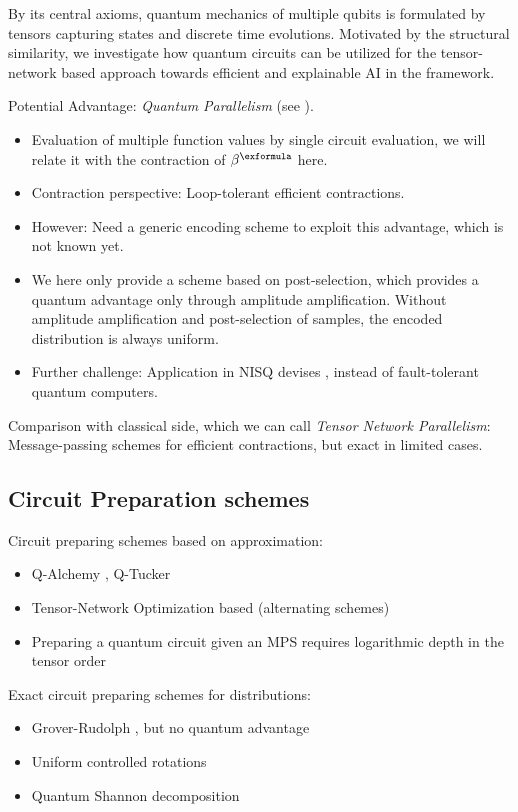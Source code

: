 By its central axioms, quantum mechanics of multiple qubits is formulated by tensors capturing states and discrete time evolutions.
Motivated by the structural similarity, we investigate how quantum circuits can be utilized for the tensor-network based approach towards efficient and explainable AI in the \tnreason{} framework.

Potential Advantage: \emph{Quantum Parallelism} (see \cite[Section 3.2.5]{schuld_machine_2021}).
\begin{itemize}
    \item Evaluation of multiple function values by single circuit evaluation, we will relate it with the contraction of $\bencodingof{\exformula}$ here.
    \item Contraction perspective: Loop-tolerant efficient contractions.
    \item However: Need a generic encoding scheme to exploit this advantage, which is not known yet.
    \item We here only provide a scheme based on post-selection, which provides a quantum advantage only through amplitude amplification.
    Without amplitude amplification and post-selection of samples, the encoded distribution is always uniform.
    \item Further challenge: Application in NISQ devises \cite{preskill_quantum_2018}, instead of fault-tolerant quantum computers.
\end{itemize}
Comparison with classical side, which we can call \emph{Tensor Network Parallelism}:
Message-passing schemes for efficient contractions, but exact in limited cases.

\subsection{Circuit Preparation schemes}

Circuit preparing schemes based on approximation:
\begin{itemize}
    \item Q-Alchemy \cite{araujo_low-rank_2023}, Q-Tucker \cite{blank_tucker_2026}
    \item Tensor-Network Optimization based (alternating schemes) \cite{rudolph_synergistic_2023,rudolph_decomposition_2023}
    \item Preparing a quantum circuit given an MPS requires logarithmic depth in the tensor order \cite{malz_preparation_2024}
\end{itemize}

Exact circuit preparing schemes for distributions:
\begin{itemize}
    \item Grover-Rudolph \cite{grover_creating_2002}, but no quantum advantage \cite{herbert_no_2021}
    \item Uniform controlled rotations \cite{mottonen_transformation_2005}
    \item Quantum Shannon decomposition \cite{shende_synthesis_2006}
\end{itemize}

